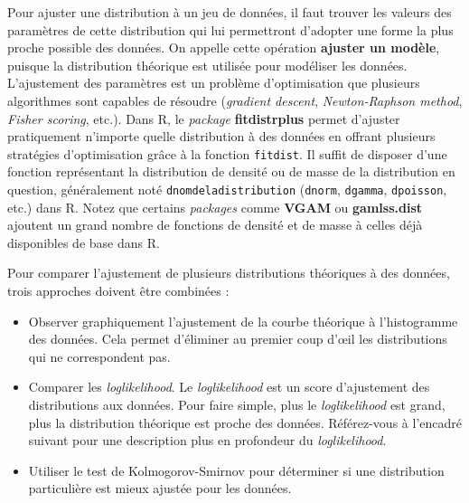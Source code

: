 \documentclass[
  11pt,
  french,
]{book}
\providecommand{\tightlist}{%
  \setlength{\itemsep}{0pt}\setlength{\parskip}{0pt}}
\begin{document}
Pour ajuster une distribution à un jeu de données, il faut trouver les valeurs des paramètres de cette distribution qui lui permettront d'adopter une forme la plus proche possible des données. On appelle cette opération \textbf{ajuster un modèle}, puisque la distribution théorique est utilisée pour modéliser les données. L'ajustement des paramètres est un problème d'optimisation que plusieurs algorithmes sont capables de résoudre (\emph{gradient descent}, \emph{Newton-Raphson method}, \emph{Fisher scoring}, etc.). Dans R, le \emph{package} \textbf{fitdistrplus} permet d'ajuster pratiquement n'importe quelle distribution à des données en offrant plusieurs stratégies d'optimisation grâce à la fonction \texttt{fitdist}. Il suffit de disposer d'une fonction représentant la distribution de densité ou de masse de la distribution en question, généralement noté \texttt{dnomdeladistribution} (\texttt{dnorm}, \texttt{dgamma}, \texttt{dpoisson}, etc.) dans R. Notez que certains \emph{packages} comme \textbf{VGAM} ou \textbf{gamlss.dist} ajoutent un grand nombre de fonctions de densité et de masse à celles déjà disponibles de base dans R.

Pour comparer l'ajustement de plusieurs distributions théoriques à des données, trois approches doivent être combinées :

\begin{itemize}
\tightlist
\item
  Observer graphiquement l'ajustement de la courbe théorique à l'histogramme des données. Cela permet d'éliminer au premier coup d'œil les distributions qui ne correspondent pas.
\item
  Comparer les \emph{loglikelihood}. Le \emph{loglikelihood} est un score d'ajustement des distributions aux données. Pour faire simple, plus le \emph{loglikelihood} est grand, plus la distribution théorique est proche des données. Référez-vous à l'encadré suivant pour une description plus en profondeur du \emph{loglikelihood}.
\item
  Utiliser le test de Kolmogorov-Smirnov pour déterminer si une distribution particulière est mieux ajustée pour les données.
\end{itemize}
\end{document}
